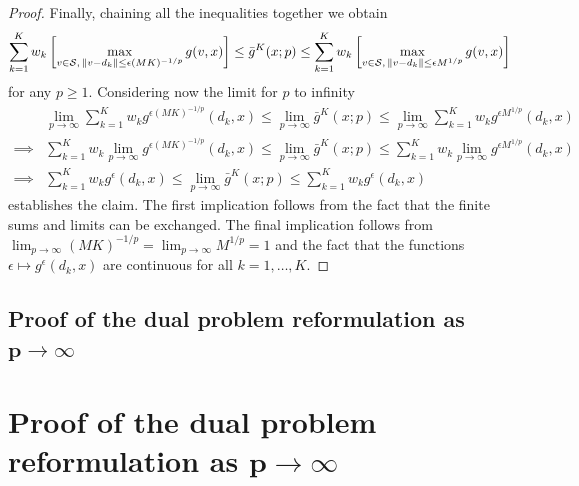 \documentclass[12pt]{article}
\theoremstyle{thmstyleone}%
\theoremstyle{thmstyletwo}%
\theoremstyle{thmstylethree}%
\begin{document}
\begin{appendices}
\begin{proof}
  Finally, chaining all the inequalities together we obtain
  \[
    \sum_{k=1}^K w_k \left[\max_{v\in \mathcal{S},\,\| v-d_k \|\leq \epsilon (MK)^{-1/p}} g(v, x)\right] \leq \bar{g}^K(x;p)  \leq \sum_{k=1}^K w_k \left[\max_{v\in \mathcal{S},\,\| v-d_k \|\leq \epsilon M^{1/p}} g(v, x)\right]
  \]
  for any $p\geq 1$.
  Considering now the limit for $p$ to infinity
  \begin{align*}
    & \lim_{p\to\infty}\sum_{k=1}^K w_k  g^{\epsilon (MK)^{-1/p}}(d_k, x)\leq \lim_{p\to\infty} \bar{g}^K(x;p) \leq \lim_{p\to\infty} \sum_{k=1}^K w_k g^{\epsilon M^{1/p}}(d_k, x) \\
    \implies &\sum_{k=1}^K w_k \lim_{p\to\infty} g^{\epsilon (MK)^{-1/p}}(d_k, x)\leq \lim_{p\to\infty} \bar{g}^K(x;p) \leq \sum_{k=1}^K w_k  \lim_{p\to\infty}  g^{\epsilon M^{1/p}}(d_k, x) \\
    \implies &  \sum_{k=1}^K w_k g^{\epsilon}(d_k, x) \leq \lim_{p\to\infty} \bar{g}^K(x; p) \leq \sum_{k=1}^K w_k g^{\epsilon}(d_k, x)
  \end{align*}
  establishes the claim.
  The first implication follows from the fact that the finite sums and limits can be exchanged. The final implication follows from
  $\lim_{p\to \infty} (MK)^{-1/p} = \lim_{p\to \infty} M^{1/p}=1$ and the fact that the functions $\epsilon \mapsto g^\epsilon(d_k, x)$ are continuous  for all $k=1,\dots, K$.
\end{proof}

\ifpreprint
\subsection{Proof of the dual problem reformulation as $\mathbf{p \rightarrow \infty}$}
\else
\section{Proof of the dual problem reformulation as $\mathbf{p \rightarrow \infty}$}
\fi
\label{app:dual_limit}


\end{appendices}
\end{document}
